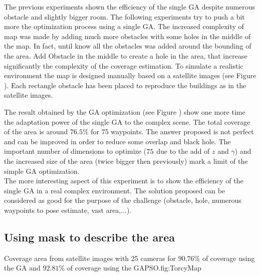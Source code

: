 The previous experiments shown the efficiency of the single GA despite numerous obstacle and slightly bigger room. The following experiments try to push a bit more the optimization process using a single GA. The increased complexity of map was made by adding much more obstacles with some holes in the middle of the map. In fact, until know all the obstacles was added around the bounding of the area. Add Obstacle in the middle to create a hole in the area, that increase significantly the complexity of the coverage estimation.
To simulate a realistic environment the map is designed manually based on a satellite images (see Figure ). Each rectangle obstacle has been placed to reproduce the buildings as in  the satellite images. 

The result obtained by the GA optimization (see Figure ) show one more time the adaptation power of the single GA to the complex scene. The total coverage of the area is around $76.5\%$ for 75 waypoints. The answer proposed is not perfect and can be improved in order to reduce some overlap and black hole. The important number of dimensions to optimize ($75\time 4$ due to the add of $z$ and  $\gamma$) and the increased size of the area (twice bigger then previously) mark a limit of the simple GA optimization.\\
	The more interesting aspect of this experiment is to show the efficiency of the single GA in a real complex environment. The solution proposed can be considered as good for the purpose of the challenge (obstacle, hole, numerous waypoints to pose estimate, vast area,...). 
  

	
	\subsection{Using mask to describe the area }\label{sec:maskGAPSO}

\begin{mfigures}[!]
{Coverage area from satellite images with 25 cameras for $90.76\%$ of coverage using the GA and $92.81\%$ of coverage using the GAPSO.}{fig:TorcyMap} \centering
{}
\hspace{1cm}
\hspace{1cm}
\tabsimuposeTorcy
\end{mfigures}


